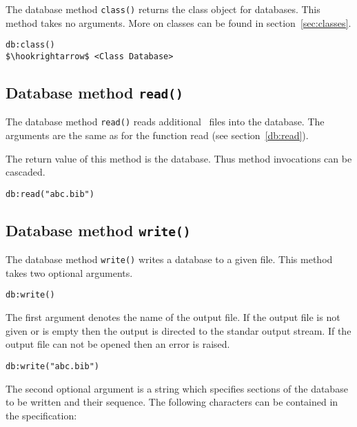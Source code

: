 \documentclass[11pt,a4paper]{scrbook}
\makeatletter
\newcommand\rsc[1]{\textsf{#1}\index{#1@\textsf{#1}}}
\makeatother
\begin{document}
The database method \texttt{class()} returns the class object for databases.
This method takes no arguments. More on classes can be found in
section~\ref{sec:classes}.

\begin{lstlisting}[language=BibTool,mathescape=true]
db:class()
$\hookrightarrow$ <Class Database>
\end{lstlisting}

\subsection{Database method \texttt{read()}}

The database method \texttt{read()} reads additional \BibTeX\ files into the
database. The arguments are the same as for the function \rsc{read} (see
section~\ref{db:read}).

The return value of this method is the database. Thus method invocations can
be cascaded.

\begin{lstlisting}[language=BibTool,mathescape=true]
db:read("abc.bib")
\end{lstlisting}

\subsection{Database method \texttt{write()}}

The database method \texttt{write()} writes a database to a given file.
This method takes two optional arguments.

\begin{lstlisting}[language=BibTool,mathescape=true]
db:write()
\end{lstlisting}

The first argument denotes the name of the output file. If the output file is
not given or is empty then the output is directed to the standar output
stream. If the output file can not be opened then an error is raised.

\begin{lstlisting}[language=BibTool,mathescape=true]
db:write("abc.bib")
\end{lstlisting}

The second optional argument is a string which specifies sections of the
database to be written and their sequence. The following characters can be
contained in the specification:
\end{document}
